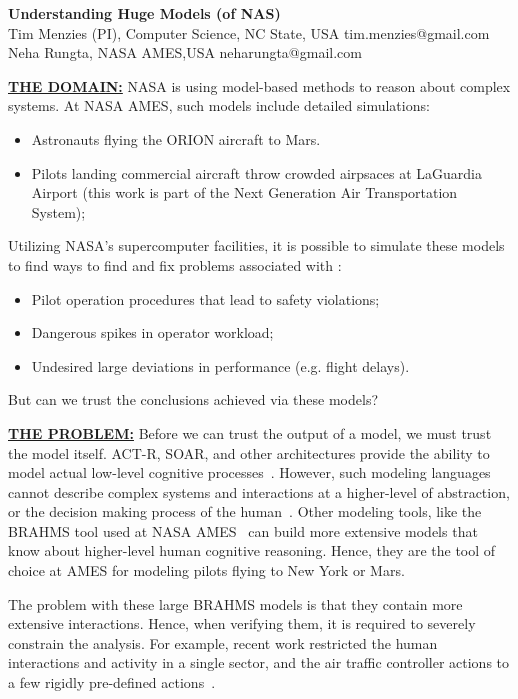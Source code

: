 \documentclass[12pt]{article}
\newcommand{\bi}{\begin{itemize}[leftmargin=0.7cm]}
\newcommand{\ei}{\end{itemize}}
\begin{document}
 
\begin{center}
{\Large {\bf  Understanding Huge  Models (of NAS)}}\\
Tim Menzies (PI), Computer Science, NC State, USA tim.menzies@gmail.com\\ 
Neha Rungta,  NASA AMES,USA  neharungta@gmail.com
\end{center}
\noindent
\underline{{\bf THE DOMAIN:}}
NASA is using model-based methods to reason about complex systems. At NASA AMES,
such models include detailed simulations:
\bi
\item Astronauts flying the ORION aircraft to Mars. 
\item Pilots landing commercial aircraft throw crowded
airpsaces at  LaGuardia Airport (this work is part of the Next Generation Air Transportation System);
\ei
Utilizing NASA's supercomputer facilities, it is possible to simulate these models to find ways to find and fix problems associated with : 
\bi
\item Pilot operation procedures that lead to safety violations;
\item Dangerous spikes in operator workload;
\item Undesired large deviations in performance (e.g. flight delays).
\ei 
But can we trust the conclusions achieved via these models?

\noindent
\underline{{\bf THE PROBLEM:}} Before we can trust the output of a model, we must trust the model itself. 
ACT-R, SOAR, and other architectures provide the ability to model actual low-level cognitive processes~\cite{anderson1997act,laird1987soar,lebiere2013cognitive,liu2009qn,lundinsimulating}. However, 
such modeling languages cannot  describe complex systems and interactions at a higher-level of abstraction, or   the decision making process of the human~\cite{pritchett2011simulating}. 
Other modeling tools, like
the BRAHMS tool used at NASA AMES~\cite{Rungta:2013,Clancey:1998:BSP:306180.306196,brahms-semantics,brahms-jelia,SierhuisPhD} can build more extensive models that know about higher-level human cognitive reasoning. Hence, they are the 
  tool of choice at   AMES for modeling pilots flying to  New York or  Mars.

The problem with  these large BRAHMS  models is that they contain   more extensive interactions. Hence, when verifying them,  it is   required to severely constrain the analysis.
For example, recent work restricted the human interactions and activity in a single sector, and the air traffic controller actions to a few  rigidly pre-defined actions~\cite{MIDAS}. 
\end{document}
